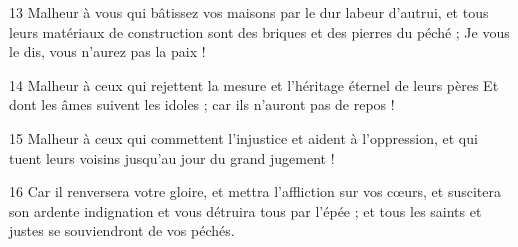 \par 13 Malheur à vous qui bâtissez vos maisons par le dur labeur d'autrui, et tous leurs matériaux de construction sont des briques et des pierres du péché ; Je vous le dis, vous n'aurez pas la paix !
\par 14 Malheur à ceux qui rejettent la mesure et l'héritage éternel de leurs pères Et dont les âmes suivent les idoles ; car ils n'auront pas de repos !
\par 15 Malheur à ceux qui commettent l'injustice et aident à l'oppression, et qui tuent leurs voisins jusqu'au jour du grand jugement !
\par 16 Car il renversera votre gloire, et mettra l'affliction sur vos cœurs, et suscitera son ardente indignation et vous détruira tous par l'épée ; et tous les saints et justes se souviendront de vos péchés.


